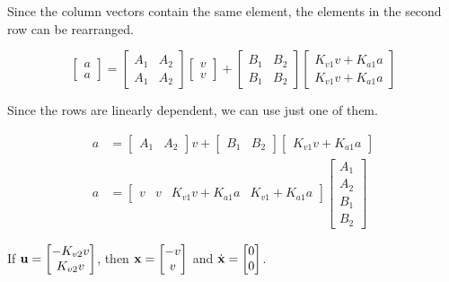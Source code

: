 Since the column vectors contain the same element, the elements in the second
row can be rearranged.

\begin{equation*}
  \begin{bmatrix}
    a \\
    a
  \end{bmatrix} =
  \begin{bmatrix}
    A_1 & A_2 \\
    A_1 & A_2
  \end{bmatrix}
  \begin{bmatrix}
    v \\
    v
  \end{bmatrix} +
  \begin{bmatrix}
    B_1 & B_2 \\
    B_1 & B_2
  \end{bmatrix}
  \begin{bmatrix}
    K_{v1} v + K_{a1} a \\
    K_{v1} v + K_{a1} a
  \end{bmatrix}
\end{equation*}

Since the rows are linearly dependent, we can use just one of them.

\begin{align*}
  a &=
    \begin{bmatrix}
      A_1 & A_2
    \end{bmatrix} v +
    \begin{bmatrix}
      B_1 & B_2
    \end{bmatrix}
    \begin{bmatrix}
      K_{v1} v + K_{a1} a
    \end{bmatrix} \\
  a &=
    \begin{bmatrix}
      v & v & K_{v1} v + K_{a1} a & K_{v1} + K_{a1} a
    \end{bmatrix}
    \begin{bmatrix}
      A_1 \\
      A_2 \\
      B_1 \\
      B_2
    \end{bmatrix}
\end{align*}

If $\mathbf{u} =
\begin{bmatrix}
  -K_{v2} v \\
  K_{v2} v
\end{bmatrix}$, then $\mathbf{x} =
\begin{bmatrix}
  -v \\
  v
\end{bmatrix}$ and $\dot{\mathbf{x}} =
\begin{bmatrix}
  0 \\
  0
\end{bmatrix}$.

